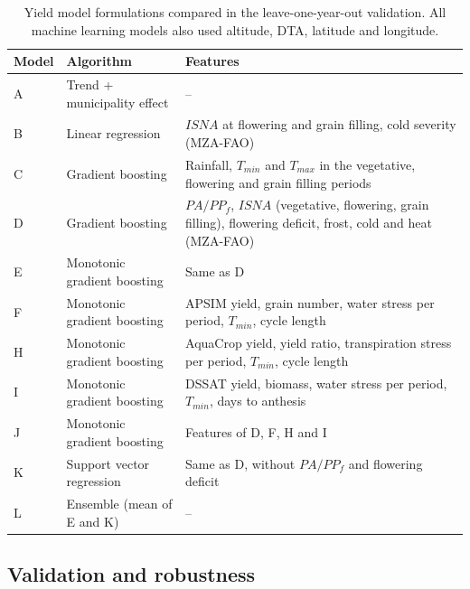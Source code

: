 \documentclass[10pt,a4paper]{article}
\begin{document}
\begin{table}[t]
\centering
\caption{Yield model formulations compared in the leave-one-year-out validation. All machine learning
models also used altitude, DTA, latitude and longitude.}
\label{tab:models}
\small
\begin{tabularx}{\textwidth}{l l X}
\toprule
Model & Algorithm & Features \\
\midrule
A & Trend + municipality effect & -- \\
B & Linear regression & $ISNA$ at flowering and grain filling, cold severity (MZA-FAO) \\
C & Gradient boosting & Rainfall, $T_{min}$ and $T_{max}$ in the vegetative, flowering and grain filling periods \\
D & Gradient boosting & $PA/PP_f$, $ISNA$ (vegetative, flowering, grain filling), flowering deficit, frost, cold and heat (MZA-FAO) \\
E & Monotonic gradient boosting & Same as D \\
F & Monotonic gradient boosting & APSIM yield, grain number, water stress per period, $T_{min}$, cycle length \\
H & Monotonic gradient boosting & AquaCrop yield, yield ratio, transpiration stress per period, $T_{min}$, cycle length \\
I & Monotonic gradient boosting & DSSAT yield, biomass, water stress per period, $T_{min}$, days to anthesis \\
J & Monotonic gradient boosting & Features of D, F, H and I \\
K & Support vector regression & Same as D, without $PA/PP_f$ and flowering deficit \\
L & Ensemble (mean of E and K) & -- \\
\bottomrule
\end{tabularx}
\end{table}

\subsection{Validation and robustness}
\label{subsec:validation}
\end{document}

